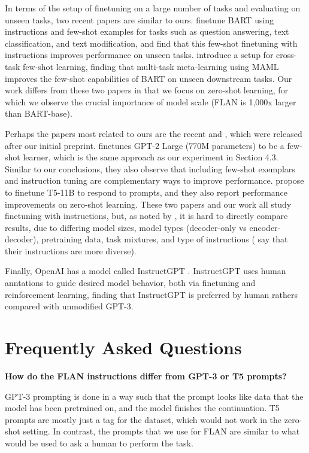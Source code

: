 \documentclass{article} %
\newcommand{\flan}{FLAN}
\begin{document}
In terms of the setup of finetuning on a large number of tasks and evaluating on unseen tasks, two recent papers are similar to ours. 
\citet{mishra2021natural} finetune BART \citep{lewis-etal-2020-bart} using instructions and few-shot examples for tasks such as question answering, text classification, and text modification, and find that this few-shot finetuning with instructions improves performance on unseen tasks.
\citet{ye2021crossfit} introduce a setup for cross-task few-shot learning, finding that multi-task meta-learning using MAML \citep{finn2017model} improves the few-shot capabilities of BART on unseen downstream tasks.
Our work differs from these two papers in that we focus on zero-shot learning, for which we observe the crucial importance of model scale (FLAN is 1,000x larger than BART-base).

Perhaps the papers most related to ours are the recent \citet{sanh2021multitask} and \citet{min2021metaicl}, which were released after our initial preprint. \citet{min2021metaicl} finetunes GPT-2 Large (770M parameters) to be a few-shot learner, which is the same approach as our experiment in Section 4.3. Similar to our conclusions, they also observe that including few-shot exemplars and instruction tuning are complementary ways to improve performance. \citet{sanh2021multitask} propose to finetune T5-11B to respond to prompts, and they also report performance improvements on zero-shot learning. These two papers and our work all study finetuning with instructions, but, as noted by \citet{min2021metaicl}, it is hard to directly compare results, due to differing model sizes, model types (decoder-only vs encoder-decoder), pretraining data, task mixtures, and type of instructions (\citet{sanh2021multitask} say that their instructions are more diverse).

Finally, OpenAI has a model called InstructGPT \citep{ouyang2022instructgpt}. 
InstructGPT uses human anntations to guide desired model behavior, both via finetuning and reinforcement learning, finding that InstructGPT is preferred by human rathers compared with unmodified GPT-3.


\clearpage
\section{Frequently Asked Questions}\label{sec:faq}

\textbf{How do the \flan{} instructions differ from GPT-3 or T5 prompts?}

GPT-3 prompting is done in a way such that the prompt looks like data that the model has been pretrained on, and the model finishes the continuation. 
T5 prompts are mostly just a tag for the dataset, which would not work in the zero-shot setting. 
In contrast, the prompts that we use for \flan{} are similar to what would be used to ask a human to perform the task.
\end{document}
